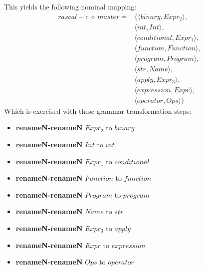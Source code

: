 This yields the following nominal mapping:
\begin{align*}\mathit{rascal-c} \:\diamond\: \mathit{master} =& \{\langle \mathit{binary},\mathit{Expr_2}\rangle,\\
 & \langle int,\mathit{Int}\rangle,\\
 & \langle \mathit{conditional},\mathit{Expr_1}\rangle,\\
 & \langle \mathit{function},\mathit{Function}\rangle,\\
 & \langle \mathit{program},\mathit{Program}\rangle,\\
 & \langle str,\mathit{Name}\rangle,\\
 & \langle \mathit{apply},\mathit{Expr_3}\rangle,\\
 & \langle \mathit{expression},\mathit{Expr}\rangle,\\
 & \langle \mathit{operator},\mathit{Ops}\rangle\}\end{align*}
 Which is exercised with these grammar transformation steps:

{\footnotesize\begin{itemize}
\item \textbf{renameN-renameN} $\mathit{Expr_2}$ to $\mathit{binary}$
\item \textbf{renameN-renameN} $\mathit{Int}$ to $int$
\item \textbf{renameN-renameN} $\mathit{Expr_1}$ to $\mathit{conditional}$
\item \textbf{renameN-renameN} $\mathit{Function}$ to $\mathit{function}$
\item \textbf{renameN-renameN} $\mathit{Program}$ to $\mathit{program}$
\item \textbf{renameN-renameN} $\mathit{Name}$ to $str$
\item \textbf{renameN-renameN} $\mathit{Expr_3}$ to $\mathit{apply}$
\item \textbf{renameN-renameN} $\mathit{Expr}$ to $\mathit{expression}$
\item \textbf{renameN-renameN} $\mathit{Ops}$ to $\mathit{operator}$
\end{itemize}}


